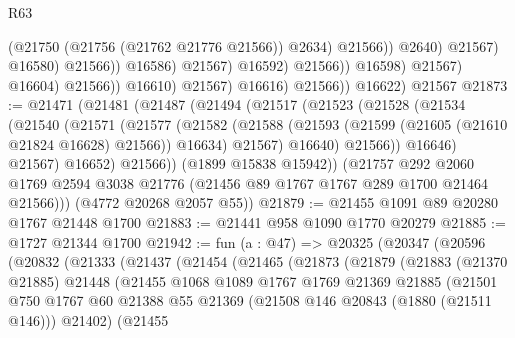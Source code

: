 \begin{lexlean}{R63}
\begin{coremodule}
                                                  (@21750 (@21756 (@21762 @21776 @21566)) @2634)
                                                  @21566))
                                              @2640)
                                            @21567)
                                          @16580)
                                        @21566))
                                    @16586)
                                  @21567)
                                @16592)
                              @21566))
                          @16598)
                        @21567)
                      @16604)
                    @21566))
                @16610)
              @21567)
            @16616)
          @21566))
      @16622)
    @21567
@21873 := @21471
    (@21481
      (@21487
        (@21494
          (@21517
            (@21523
              (@21528
                (@21534
                  (@21540
                    (@21571
                      (@21577
                        (@21582
                          (@21588
                            (@21593 (@21599 (@21605 (@21610 @21824 @16628) @21566)) @16634)
                            @21567)
                          @16640)
                        @21566))
                    @16646)
                  @21567)
                @16652)
              @21566))
          (@1899 @15838 @15942))
        (@21757
          @292
          @2060
          @1769
          @2594
          @3038
          @21776
          (@21456 @89 @1767 @1767 @289 @1700 @21464 @21566)))
      (@4772 @20268 @2057 @55))
@21879 := @21455 @1091 @89 @20280 @1767 @21448 @1700
@21883 := @21441 @958 @1090 @1770 @20279
@21885 := @1727 @21344 @1700
@21942 := fun (a : @47) =>
  @20325
    (@20347
      (@20596
        (@20832
          (@21333
            (@21437
              (@21454
                (@21465
                  (@21873
                    (@21879
                      (@21883
                        (@21370 @21885)
                        @21448
                        (@21455
                          @1068
                          @1089
                          @1767
                          @1769
                          @21369
                          @21885
                          (@21501
                            @750
                            @1767
                            @60
                            @21388
                            @55
                            @21369
                            (@21508 @146 @20843 (@1880 (@21511 @146)))
                            @21402)
                          (@21455

\end{coremodule}
\end{lexlean}
